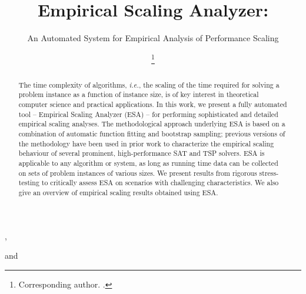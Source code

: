 \documentclass[aic]{iosart2x}
\newcommand{\ie}{\emph{i.e.}}
\begin{document}
\begin{frontmatter}

\title{Empirical Scaling Analyzer:}
\subtitle{An Automated System for Empirical Analysis of Performance Scaling}


\author[A]{ },
\author[A]{ }
and
\author[B,A]{ %
\thanks{Corresponding author. .}}
\address[A]{Department of Computer Science, ,
BC, }
\address[B]{LIACS, , }

\begin{abstract}
The time complexity of algorithms, \ie, the scaling of the time required for solving a problem instance as a function of instance size, is of key interest in theoretical computer science and practical applications. In this work, we present a fully automated tool -- Empirical Scaling Analyzer (ESA) -- for performing sophisticated and detailed empirical scaling analyses. The methodological approach underlying ESA is based on a combination of automatic function fitting and bootstrap sampling; previous versions of the methodology have been used in prior work to characterize the empirical scaling behaviour of several prominent, high-performance SAT and TSP solvers. ESA is applicable to any algorithm or system, as long as running time data can be collected on sets of problem instances of various sizes. We present results from rigorous stress-testing to critically assess ESA on scenarios with challenging characteristics. 
We also give an overview of empirical scaling results obtained using ESA.
\end{abstract}

\begin{keyword}
\end{keyword}

\end{frontmatter}
\end{document}
